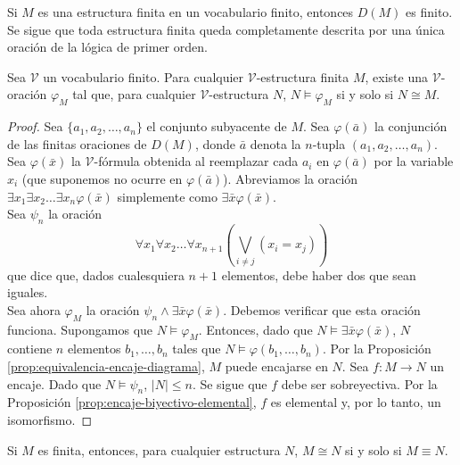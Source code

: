 \documentclass[12pt,a4paper]{book}
\newcommand{\VV}{\mathcal{V}}
\begin{document}
    Si $M$ es una estructura finita en un vocabulario finito, entonces $D(M)$ es finito. Se sigue que toda estructura
    finita queda completamente descrita por una única oración de la lógica de primer orden.

    \begin{proposicion}\label{prop:sentencia-caracteriza-grafo-finito}
        Sea $\VV$ un vocabulario finito. Para cualquier $\VV$-estructura finita $M$, existe una $\VV$-oración
        $\varphi_{M}$ tal que, para cualquier $\VV$-estructura $N$, $N\models\varphi_{M}$ si y solo si $N\cong M$.
    \end{proposicion}
    \begin{proof}
        Sea $\{a_{1},a_{2},\dots,a_{n}\}$ el conjunto subyacente de $M$. Sea $\varphi(\bar{a})$ la conjunción de las
        finitas oraciones de $D(M)$, donde $\bar{a}$ denota la $n$-tupla $(a_{1},a_{2},\dots,a_{n})$. Sea $\varphi(\bar{x})$
        la $\VV$-fórmula obtenida al reemplazar cada $a_{i}$ en $\varphi(\bar{a})$ por la variable $x_{i}$ (que suponemos
        no ocurre en $\varphi(\bar{a})$). Abreviamos la oración $\exists x_{1}\exists x_{2}\dots\exists x_{n}\varphi(\bar{x})$
        simplemente como $\exists\bar{x}\varphi(\bar{x})$.\\
        Sea $\psi_{n}$ la oración
        \begin{equation*}
            \forall x_{1}\forall x_{2}\dots\forall x_{n+1}\left(\bigvee_{i\neq j}(x_{i}=x_{j})\right)
        \end{equation*}
        que dice que, dados cualesquiera $n+1$ elementos, debe haber dos que sean iguales.\\
        Sea ahora $\varphi_{M}$ la oración $\psi_{n}\wedge\exists\bar{x}\varphi(\bar{x})$. Debemos verificar que esta
        oración funciona. Supongamos que $N\models\varphi_{M}$. Entonces, dado que $N\models\exists\bar{x}\varphi(\bar{x})$,
        $N$ contiene $n$ elementos $b_{1},\dots,b_{n}$ tales que $N\models\varphi(b_{1},\dots,b_{n})$. Por la Proposición
        \ref{prop:equivalencia-encaje-diagrama}, $M$ puede encajarse en $N$. Sea $f:M\rightarrow N$ un encaje. Dado que
        $N\models\psi_{n}$, $|N|\leq n$. Se sigue que $f$ debe ser sobreyectiva. Por la Proposición
        \ref{prop:encaje-biyectivo-elemental}, $f$ es elemental y, por lo tanto, un isomorfismo.
    \end{proof}

    \begin{corolario}\label{cor:isomorfo-sii-equivalente-finito}
        Si $M$ es finita, entonces, para cualquier estructura $N$, $M\cong N$ si y solo si $M\equiv N$.
    \end{corolario}
\end{document}
